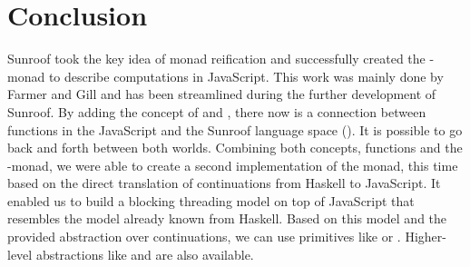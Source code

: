  
\section{Conclusion}

Sunroof took the key idea of monad reification and
successfully created the \JS-monad to describe computations
in JavaScript. This work was mainly done by Farmer and
Gill \cite{Farmer:12:WebDSLs} and has been streamlined during the 
further development of Sunroof. By adding the concept 
of  and , there now is a connection between
functions in the JavaScript and the Sunroof language space 
(). It is possible to go back and forth between 
both worlds. Combining both concepts, functions and the \JS-monad,
we were able to create a second implementation of the monad, this
time based on the direct translation of continuations from Haskell
to JavaScript. It enabled us to build a blocking threading model
on top of JavaScript that resembles the model already known from Haskell.
Based on this model and the provided abstraction over continuations,
we can use primitives like  or .
Higher-level abstractions like  and  are also
available. 
